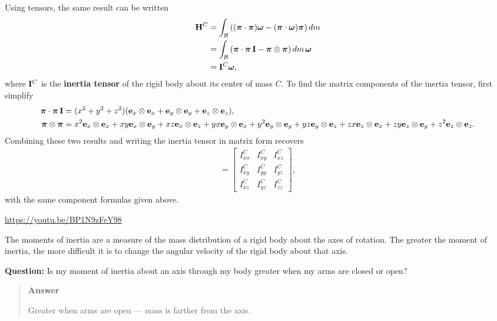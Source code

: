 \documentclass[
  letterpaper,
  DIV=11,
  numbers=noendperiod]{scrreprt}
\newcommand{\lp}{\left(}
\newcommand{\rp}{\right)}
\newcommand{\bomega}{\boldsymbol{\omega}}
\newcommand{\bpi}{\boldsymbol{\pi}}
\begin{document}
Using tensors, the same result can be written \begin{align}
    {\bf H}^C &= \int_{\mathcal{B}}\lp(\bpi\cdot\bpi)\bomega-(\bpi\cdot\bomega)\bpi\rp dm\\
    &= \int_{\mathcal{B}}\lp\bpi\cdot\bpi\,{\bf I}-\bpi\otimes\bpi\rp dm\,\bomega\\
    &= {\bf I}^C\bomega,
\end{align} where \({\bf I}^C\) is the \textbf{inertia tensor} of the
rigid body about its center of mass \(C\). To find the matrix components
of the inertia tensor, first simplify \begin{align}
    \bpi\cdot\bpi\,{\bf I} &= (x^2+y^2+z^2)({\bf e}_x\otimes{\bf e}_x+{\bf e}_y\otimes{\bf e}_y+{\bf e}_z\otimes{\bf e}_z),\\
    \bpi\otimes\bpi &= x^2{\bf e}_x\otimes{\bf e}_x+xy{\bf e}_x\otimes{\bf e}_y+xz{\bf e}_x\otimes{\bf e}_z+yx{\bf e}_y\otimes{\bf e}_x+y^2{\bf e}_y\otimes{\bf e}_y+yz{\bf e}_y\otimes{\bf e}_z+zx{\bf e}_z\otimes{\bf e}_x+zy{\bf e}_z\otimes{\bf e}_y+z^2{\bf e}_z\otimes{\bf e}_z.
\end{align} Combining these two results and writing the inertia tensor
in matrix form recovers \begin{align}
    [{\bf I}^C] =
    \begin{bmatrix}I^C_{xx}&I^C_{xy}&I^C_{xz}\\I^C_{xy}&I^C_{yy}&I^C_{yz}\\I^C_{xz}&I^C_{yz}&I^C_{zz}\end{bmatrix},
\end{align} with the same component formulas given above.

\url{https://youtu.be/BP1N9zFeY98}

The moments of inertia are a measure of the mass distribution of a rigid
body about the axes of rotation. The greater the moment of inertia, the
more difficult it is to change the angular velocity of the rigid body
about that axis.

\begin{tcolorbox}[enhanced jigsaw, arc=.35mm, bottomrule=.15mm, bottomtitle=1mm, breakable, colback=white, colbacktitle=quarto-callout-tip-color!10!white, colframe=quarto-callout-tip-color-frame, coltitle=black, left=2mm, leftrule=.75mm, opacityback=0, opacitybacktitle=0.6, rightrule=.15mm, title=\textcolor{quarto-callout-tip-color}{\faLightbulb}\hspace{0.5em}{Think!}, titlerule=0mm, toprule=.15mm, toptitle=1mm]

\textbf{Question:} Is my moment of inertia about an axis through my body
greater when my arms are closed or open?

\begin{quote}
\textbf{Answer}

Greater when arms are open --- mass is farther from the axis.
\end{quote}

\end{tcolorbox}
\end{document}
